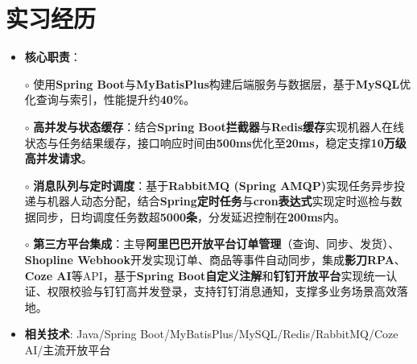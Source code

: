\section{实习经历}
  \begin{normalsize}
    \begin{itemize}
    \item \textbf{核心职责}：
    \setlength{\itemindent}{1em}
  \item[$\circ$] 使用\textbf{Spring Boot}与\textbf{MyBatisPlus}构建后端服务与数据层，基于\textbf{MySQL}优化查询与索引，性能提升约\textbf{40\%}。
  \item[$\circ$] \textbf{高并发与状态缓存}：结合\textbf{Spring Boot拦截器}与\textbf{Redis缓存}实现机器人在线状态与任务结果缓存，接口响应时间由\textbf{500ms}优化至\textbf{20ms}，稳定支撑\textbf{10万级高并发请求}。
  \item[$\circ$] \textbf{消息队列与定时调度}：基于\textbf{RabbitMQ (Spring AMQP)}实现任务异步投递与机器人动态分配，结合\textbf{Spring定时任务}与\textbf{cron表达式}实现定时巡检与数据同步，日均调度任务数超\textbf{5000条}，分发延迟控制在\textbf{200ms}内。
  \item[$\circ$] \textbf{第三方平台集成}：主导\textbf{阿里巴巴开放平台订单管理}（查询、同步、发货）、\textbf{Shopline Webhook}开发实现订单、商品等事件自动同步，集成\textbf{影刀RPA}、\textbf{Coze AI}等API，基于\textbf{Spring Boot自定义注解}和\textbf{钉钉开放平台}实现统一认证、权限校验与钉钉高并发登录，支持钉钉消息通知，支撑多业务场景高效落地。
    \setlength{\itemindent}{0em}
    \item \textbf{相关技术}: Java/Spring Boot/MyBatisPlus/MySQL/Redis/RabbitMQ/Coze AI/主流开放平台
    \end{itemize}
  \end{normalsize}
